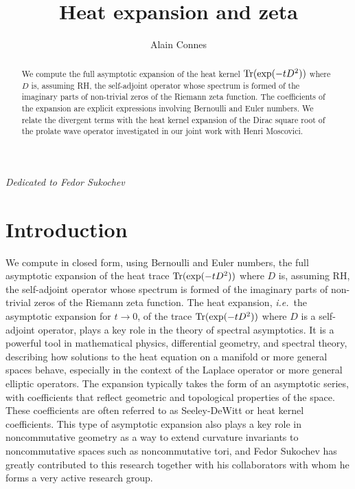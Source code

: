 \documentclass[reqno,12pt]{amsart}
\author{Alain Connes}
\title{\LARGE Heat expansion and zeta}
\def\Tr{{\rm Tr}}
\def\Tr{{\rm Tr}}
\newcommand{\ie}{{\it i.e.\/}\ }
\begin{document}
%
%


\maketitle	

\begin{abstract}
We compute the full asymptotic expansion of the heat kernel $	\Tr(\exp(-tD^2))$ where $D$ is, assuming RH, the self-adjoint operator whose spectrum is formed of the imaginary parts of non-trivial zeros of the Riemann zeta function. The coefficients of the expansion are explicit expressions involving Bernoulli and Euler numbers. We relate the divergent terms with the heat kernel expansion of the Dirac square root of the prolate wave operator investigated in our joint work with Henri Moscovici.
\end{abstract}
\vspace{1cm}
\begin{center} %
\itshape %
Dedicated to Fedor Sukochev %
\end{center}
\tableofcontents
\section{Introduction}
We compute in closed form, using Bernoulli and Euler numbers, the  full asymptotic expansion of the heat trace $	\Tr(\exp(-tD^2))$ where $D$ is, assuming RH, the self-adjoint operator whose spectrum is formed of the imaginary parts of non-trivial zeros of the Riemann zeta function.
The heat expansion, \ie the asymptotic expansion for $t\to 0$, of the trace
	$	\Tr(\exp(-tD^2))$ where $D$ is a  self-adjoint operator, plays a key role in the theory of spectral asymptotics. 
It is a powerful tool in mathematical physics, differential geometry, and spectral theory, describing how solutions to the heat equation on a manifold or more general spaces behave, especially in the context of the Laplace operator or more general elliptic operators. The expansion typically takes the form of an asymptotic series, with coefficients that reflect geometric and topological properties of the space. These coefficients are often referred to as Seeley-DeWitt or heat kernel coefficients. This type of asymptotic expansion also plays a key role in noncommutative geometry as a way to extend curvature invariants to noncommutative spaces such as noncommutative tori, and Fedor Sukochev has greatly contributed to this research together with his collaborators with whom he forms a very active research group.
\end{document}
